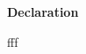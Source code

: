 \thispagestyle{plain}
\vspace*{\fill}
    \begin{center}
        \Large
        \textbf{Declaration}
    \end{center}

    \vspace{1cm}

    fff
\vspace*{\fill}
